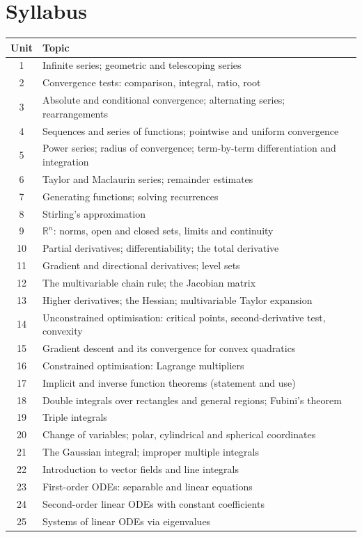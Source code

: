 \documentclass[11pt,a4paper]{article}
\begin{document}
\section{Syllabus}
\begin{tabularx}{\textwidth}{c X}
\toprule
\textbf{Unit} & \textbf{Topic} \\
\midrule
1  & Infinite series; geometric and telescoping series \\
2  & Convergence tests: comparison, integral, ratio, root \\
3  & Absolute and conditional convergence; alternating series; rearrangements \\
4  & Sequences and series of functions; pointwise and uniform convergence \\
5  & Power series; radius of convergence; term-by-term differentiation and integration \\
6  & Taylor and Maclaurin series; remainder estimates \\
7  & Generating functions; solving recurrences \\
8  & Stirling's approximation \\
9  & $\mathbb{R}^n$: norms, open and closed sets, limits and continuity \\
10 & Partial derivatives; differentiability; the total derivative \\
11 & Gradient and directional derivatives; level sets \\
12 & The multivariable chain rule; the Jacobian matrix \\
13 & Higher derivatives; the Hessian; multivariable Taylor expansion \\
14 & Unconstrained optimisation: critical points, second-derivative test, convexity \\
15 & Gradient descent and its convergence for convex quadratics \\
16 & Constrained optimisation: Lagrange multipliers \\
17 & Implicit and inverse function theorems (statement and use) \\
18 & Double integrals over rectangles and general regions; Fubini's theorem \\
19 & Triple integrals \\
20 & Change of variables; polar, cylindrical and spherical coordinates \\
21 & The Gaussian integral; improper multiple integrals \\
22 & Introduction to vector fields and line integrals \\
23 & First-order ODEs: separable and linear equations \\
24 & Second-order linear ODEs with constant coefficients \\
25 & Systems of linear ODEs via eigenvalues \\
\bottomrule
\end{tabularx}
\end{document}
